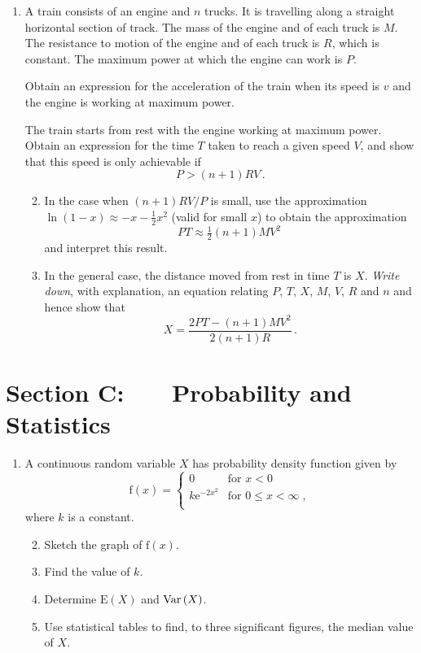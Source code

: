 \documentclass[a4, 11pt]{report}
\newlength{\qspace}
\newcounter{qnumber}
\newenvironment{question}%
 {\vspace{\qspace}
  \begin{enumerate}[\bfseries 1\quad][10]%
    \setcounter{enumi}{\value{qnumber}}%
    \item%
 }
{
  \end{enumerate}
  \filbreak
  \stepcounter{qnumber}
 }
\newenvironment{questionparts}[1][1]%
 {
  \begin{enumerate}[\bfseries (i)]%
    \setcounter{enumii}{#1}
    \addtocounter{enumii}{-1}
    \setlength{\itemsep}{5mm}
    \setlength{\parskip}{8pt}
 }
 {
  \end{enumerate}
 }
\def\e{{\mathrm e}}
\def\f{{\mathrm f}}
\def\E{{\mathrm E}}
\def\le{\leqslant}
\def\var{{\rm Var}\,}
\begin{document}
\begin{question}
A train consists of an engine and $n$ trucks.
 It is travelling along a straight
horizontal section of track. The mass of the engine and of each 
 truck is $M$. The resistance to motion
 of the engine and of each 
 truck is $R$, which is constant. 
The maximum power at which the engine can work
is  $P$. 

Obtain an expression for the acceleration  of the train
when its speed is $v$ and  the engine is working at maximum power.


The train starts from rest with the engine working at
maximum power. Obtain an expression for the
time $T$ taken to reach a given speed $V$, and 
show that this speed is only achievable  if
\[
P>(n+1)RV\,.
\]
\begin{questionparts}

\item In the case when $(n+1) RV/P$ is small, use the approximation
$\ln (1-x) \approx -x -\frac12 x^2$ (valid for small $ x $)
to obtain the  approximation
\[
PT\approx \tfrac 12 (n+1) MV^2\,
\]
and interpret this result.

\item In the general case, the distance moved from rest in time $T$ is $X$.
{\em Write down}, with explanation,
an equation relating $P$, $T$, $X$, $M$, $V$, $R$ and $n$ and hence
show that
\[
X= \frac{2PT - (n+1)MV^2}{2(n+1)R}
\,.
\]


\end{questionparts}
\end{question}
	

	
	\newpage
\section*{Section C: \ \ \ Probability and Statistics}


\begin{question}
A continuous random variable $X$ has probability density function
given by
\[
\f(x) = 
\begin{cases}
0 & \mbox{for } x<0 \\
k\e^{-2 x^2} & \mbox{for } 0\le x< \infty \;,\\
\end{cases}
\] 
where $k$ is a constant.

\begin{questionparts}
\item Sketch the graph of $\f(x)$.
\item Find the value of  $k$.
\item Determine $\E(X)$ and  $\var(X)$.
\item Use statistical tables  to find,
to three significant figures, the median value of $X$.
\end{questionparts}
\end{question}
\end{document}
